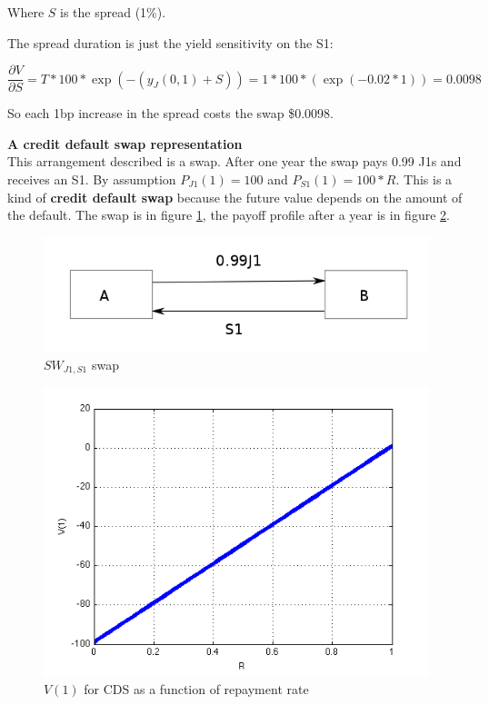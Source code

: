 Where $S$ is the spread (1\%). 

The spread duration is just the yield sensitivity on the S1:

\[ \frac{\partial V}{\partial S} = T *100*\exp(-(y_J(0,1)+S)) = 1*100*(\exp(-0.02*1)) = 0.0098 \]

So each 1bp increase in the spread costs the swap \$0.0098.

\textbf{A credit default swap representation}\\

This arrangement described is a swap. After one year the swap pays 0.99 J1s  and receives an S1. By assumption $P_{J1}(1) = 100$ and $P_{S1}(1) = 100*R$. This is a kind of \textbf{credit default swap} because the future value depends on the amount of the default. The swap is in figure \ref{fig:creditSwap}, the payoff profile after a year is in figure \ref{fig:CDSR}.

\begin{figure}[ht]
\centering
  \includegraphics[width=5in] {pics/creditSwap}
\caption{$SW_{J1,S1}$ swap}
\label{fig:creditSwap}
\end{figure}

\begin{figure}[ht]
\centering
  \includegraphics[width=5in] {pics/CDSR}
\caption{$V(1)$ for CDS as a function of repayment rate}
\label{fig:CDSR}
\end{figure}

